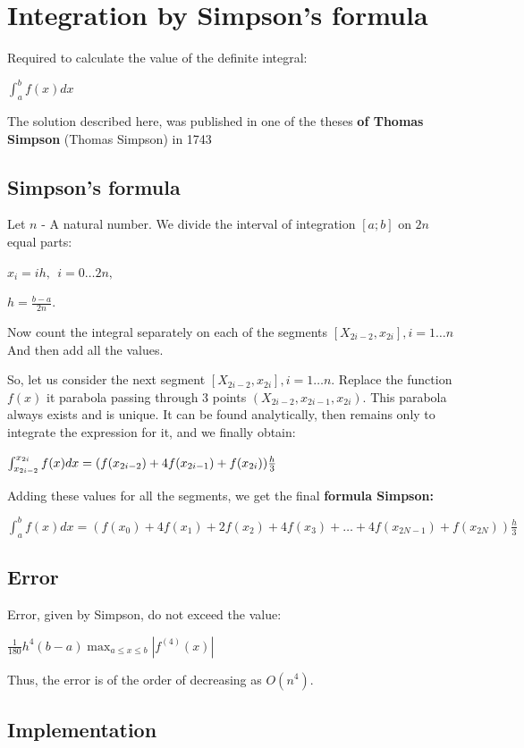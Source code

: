\section{ Integration by Simpson's formula }
Required to calculate the value of the definite integral:

$\int_a ^ b f (x) dx$

The solution described here, was published in one of the theses \textbf{of Thomas Simpson} (Thomas Simpson) in 1743

\subsection{ Simpson's formula }

Let $n$ - A natural number. We divide the interval of integration $[a; b]$ on $2n$ equal parts:

$x_i = i h, ~ ~ i = 0 \ldots 2n,$

$h = \frac {b-a} {2n}.$

Now count the integral separately on each of the segments $[X_ {2i-2}, x_ {2i}], i = 1 \ldots n$ And then add all the values.

So, let us consider the next segment $[X_ {2i-2}, x_ {2i}], i = 1 \ldots n$. Replace the function $f (x)$ it parabola passing through 3 points $(X_ {2i-2}, x_ {2i-1}, x_ {2i})$. This parabola always exists and is unique. It can be found analytically, then remains only to integrate the expression for it, and we finally obtain:

$\intop_{x_{2i-2}}^{x_{2i}}f(x)dx=(f(x_{2i-2})+4f(x_{2i-1})+f(x_{2i}))\frac{h}{3}$

Adding these values ​​for all the segments, we get the final \textbf{formula Simpson:}

$\int_{a}^{b}f(x)dx=(f(x_{0})+4f(x_{1})+2f(x_{2})+4f(x_{3})+\ldots+4f(x_{2N-1})+f(x_{2N}))\frac{h}{3}$

\subsection{ Error }

Error, given by Simpson, do not exceed the value:

$\frac{1}{180}h^{4}(b-a)\max_{a\leq x\leq b}\left|f^{(4)}(x)\right|$

Thus, the error is of the order of decreasing as $O (n ^ 4)$.

\subsection{ Implementation }


